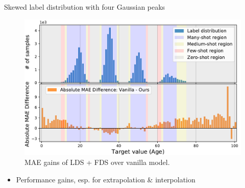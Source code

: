 \begin{frame}{Skewed label distribution with four Gaussian peaks}
	\begin{figure}[h]
		\includegraphics[width=0.7\linewidth]{images/interp_extrap_diff_peak4.pdf}
		\caption{MAE gains of LDS + FDS over vanilla model.}
	\end{figure}
	\begin{itemize}
		\item Performance gains, esp. for extrapolation \& interpolation
	\end{itemize}
\end{frame}

